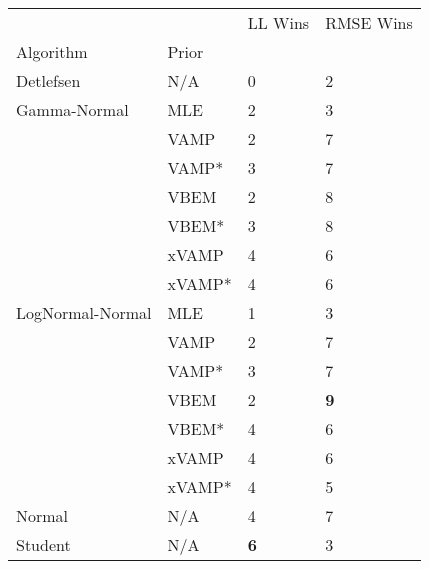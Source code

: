 \begin{tabular}{llll}
\toprule
        &     &     LL Wins &   RMSE Wins \\
Algorithm & Prior &             &             \\
\midrule
Detlefsen & N/A &           0 &           2 \\
Gamma-Normal & MLE &           2 &           3 \\
        & VAMP &           2 &           7 \\
        & VAMP* &           3 &           7 \\
        & VBEM &           2 &           8 \\
        & VBEM* &           3 &           8 \\
        & xVAMP &           4 &           6 \\
        & xVAMP* &           4 &           6 \\
LogNormal-Normal & MLE &           1 &           3 \\
        & VAMP &           2 &           7 \\
        & VAMP* &           3 &           7 \\
        & VBEM &           2 &  \textbf{9} \\
        & VBEM* &           4 &           6 \\
        & xVAMP &           4 &           6 \\
        & xVAMP* &           4 &           5 \\
Normal & N/A &           4 &           7 \\
Student & N/A &  \textbf{6} &           3 \\
\bottomrule
\end{tabular}

